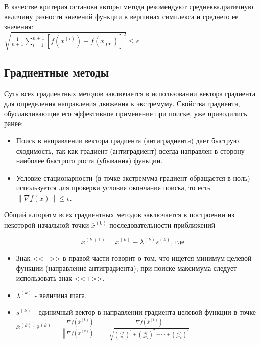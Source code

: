 \documentclass[a4paper,12pt]{report}
\begin{document}
В качестве критерия останова авторы метода рекомендуют среднеквадратичную величину разности значений функции в вершинах симплекса и среднего ее значения:\\ $\sqrt{\frac{1}{n+1}\sum\limits_{i=1}^{n+1}\left[f(\overline{x}^{(i)}) - f(\overline{x}_{\text{ц.т.}})\right]^{2}} \leq \epsilon$

\subsection{Градиентные методы}
Суть всех градиентных методов заключается в использовании вектора градиента для определения направления движения к экстремуму. Свойства градиента, обуславливающие его эффективное применение при поиске, уже приводились ранее:
\begin{itemize}
\item Поиск в направлении вектора градиента (антиградиента) дает быструю сходимость, так как градиент (антиградиент) всегда направлен в сторону наиболее быстрого роста (убывания) функции.
\item Условие стационарности (в точке экстремума градиент обращается в ноль) используется для проверки условия окончания поиска, то есть $\left\|\nabla f(\overline{x})\right\| \leq \epsilon$.
\end{itemize}
 
Общий алгоритм всех градиентных методов заключается в построении из некоторой начальной точки $\overline{x}^{(0)}$ последовательности приближений

\begin{equation}
\label{eq:num19}
\overline{x}^{(k+1)} = \overline{x}^{(k)} - \lambda^{(k)}\overline{s}^{(k)}\text{, где}
\end{equation}

\begin{itemize}
\item Знак <<$-$>> в правой части говорит о том, что ищется минимум целевой функции (направление антиградиента); при поиске максимума следует использовать знак <<$+$>>.
\item $\lambda^{(k)}$ - величина шага.
\item $\overline{s}^{(k)}$ - единичный вектор в направлении градиента целевой функции в точке $\overline{x}^{(k)}$: $\overline{s}^{(k)} = \frac{\nabla f(\overline{x}^{(k)})}{\left\|\nabla f(\overline{x}^{(k)})\right\|} = \frac{\nabla f(\overline{x}^{(k)})}{\sqrt{\left(\frac{\partial f}{\partial x_{1}}\right)^{2} + \left(\frac{\partial f}{\partial x_{2}}\right)^{2} + \cdots + \left(\frac{\partial f}{\partial x_{n}}\right)^{2}}}$
\end{itemize}
\end{document}
